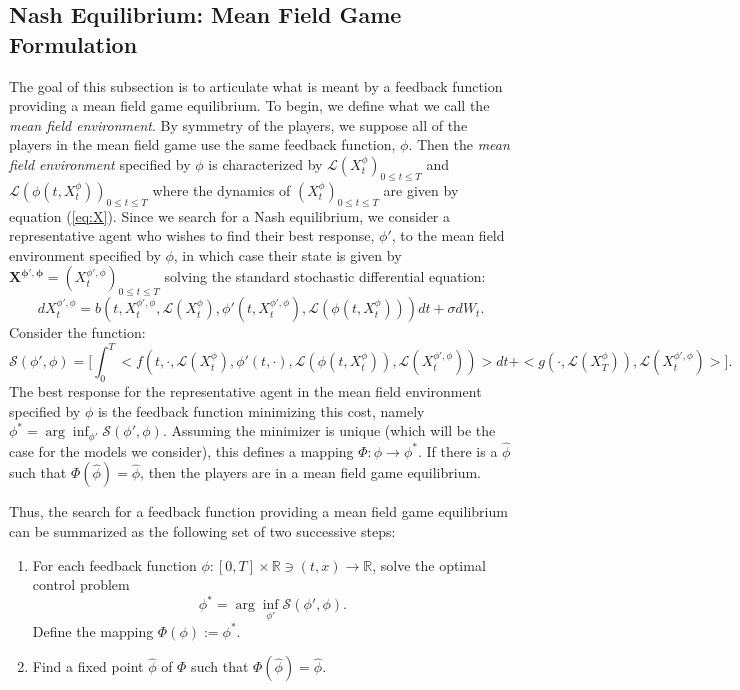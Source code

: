 \documentclass[11pt]{article}
\newcommand\cL{\mathcal L}
\newcommand\cS{\mathcal S}
\begin{document}
\subsection{\textbf{Nash Equilibrium: Mean Field Game Formulation}}
\label{sub:MFG_formulation}
The goal of this subsection is to articulate what is meant by a feedback function providing a mean field game equilibrium. To begin, we define what we call the \textit{mean field environment}. By symmetry of the players, we suppose all of the players in the mean field game use the same feedback function, $\phi$. Then the \textit{mean field environment} specified by $\phi$ is characterized by $\cL(X^{\phi}_t)_{0\le t\le T}$ and $\cL(\phi(t,X^{\phi}_t))_{0\le t\le T}$ where the dynamics of $(X^{\phi}_t)_{0\le t\le T}$ are given by equation (\ref{eq:X}). Since we search for a Nash equilibrium, we consider a representative agent who wishes to find their best response, $\phi'$, to the mean field environment specified by $\phi$, in which case their state is given by $\boldsymbol{X^{\phi',\phi}}=(X^{\phi',\phi}_t)_{0\le t\le T}$ solving the standard stochastic differential equation:
\begin{equation*}
    dX^{\phi',\phi}_t=b(t,X^{\phi',\phi}_t,\cL(X^{\phi}_t),\phi'(t,X^{\phi',\phi}_t),\cL(\phi(t,X^{\phi}_t)))dt+\sigma dW_t.
\end{equation*}
Consider the function:
\begin{equation*}
    \cS(\phi',\phi)=\biggl[\int_0^T<f(t,\cdot,\cL(X^{\phi}_t),\phi'(t,\cdot),\cL(\phi(t,X^{\phi}_t)),\cL(X^{\phi',\phi}_t))> dt +<g(\cdot,\cL(X^{\phi}_T)),\cL(X^{\phi',\phi}_t)>\biggr].
\end{equation*}
The best response for the representative agent in the mean field environment specified by $\phi$ is the feedback function minimizing this cost, namely $\phi^*=\arg\inf_{\phi'}\cS(\phi',\phi)$. Assuming the minimizer is unique (which will be the case for the models we consider), this defines a mapping $\Phi:\phi \rightarrow \phi^*$. If there is a $\hat{\phi}$ such that $\Phi(\hat{\phi})=\hat{\phi}$, then the players are in a mean field game equilibrium.


Thus, the search for a feedback function providing a mean field game equilibrium can be summarized as the following set of two successive steps:
\begin{enumerate}
\item For each feedback function $\phi:[0,T] \times \mathbb{R} \ni (t,x) \rightarrow \mathbb{R}$, solve the optimal control problem
\begin{equation*}
    \phi^*=\arg \inf_{\phi'}\cS(\phi',\phi).
\end{equation*}
Define the mapping $\Phi(\phi):=\phi^*$.
\item Find a fixed point $\hat{\phi}$ of $\Phi$ such that $\Phi(\hat{\phi})=\hat{\phi}$.
\end{enumerate}
\end{document}
